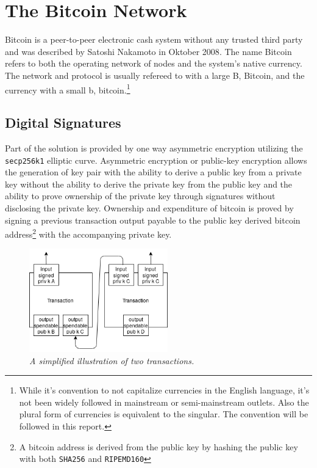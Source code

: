 \chapter{The Bitcoin Network}
	\label{sec:bitcoin}

Bitcoin is a peer-to-peer electronic cash system without any trusted third party and was described by Satoshi Nakamoto in Oktober 2008\cite{nakamoto:bitcoin}. The name Bitcoin refers to both the operating network of nodes and the system's native currency. The network and protocol is usually refereed to with a large B, Bitcoin, and the currency with a small b, bitcoin.\footnote{While it's convention to not capitalize currencies in the English language, it's not been widely followed in mainstream or semi-mainstream outlets. Also the plural form of currencies is equivalent to the singular. The convention will be followed in this report.}

\section{Digital Signatures}

Part of the solution is provided by one way asymmetric encryption utilizing the \texttt{secp256k1} elliptic curve. Asymmetric encryption or public-key encryption allows the generation of key pair with the ability to derive a public key from a private key without the ability to derive the private key from the public key and the ability to prove ownership of the private key through signatures without disclosing the private key. Ownership and expenditure of bitcoin is proved by signing a previous transaction output payable to the public key derived bitcoin address\footnote{A bitcoin address is derived from the public key by hashing the public key with both \texttt{SHA256} and \texttt{RIPEMD160}} with the accompanying private key. 

\begin{figure}[!htb]

	\centering
	\includegraphics[width=6cm]{images/transaction.png}
	\caption{\textit{A simplified illustration of two transactions. 
	}}
	\label{fig:two:tx}

\end{figure}

